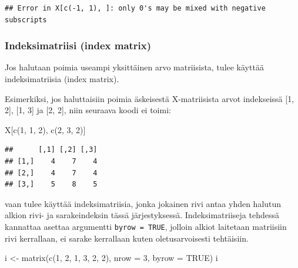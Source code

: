 \documentclass[
]{book}
\newenvironment{Shaded}{\begin{snugshade}}{\end{snugshade}}
\newcommand{\AttributeTok}[1]{\textcolor[rgb]{0.77,0.63,0.00}{#1}}
\newcommand{\ConstantTok}[1]{\textcolor[rgb]{0.00,0.00,0.00}{#1}}
\newcommand{\DecValTok}[1]{\textcolor[rgb]{0.00,0.00,0.81}{#1}}
\newcommand{\FunctionTok}[1]{\textcolor[rgb]{0.00,0.00,0.00}{#1}}
\newcommand{\NormalTok}[1]{#1}
\newcommand{\OtherTok}[1]{\textcolor[rgb]{0.56,0.35,0.01}{#1}}
\begin{document}
\begin{verbatim}
## Error in X[c(-1, 1), ]: only 0's may be mixed with negative subscripts
\end{verbatim}

\hypertarget{indeksimatriisi-index-matrix}{%
\subsubsection{Indeksimatriisi (index matrix)}\label{indeksimatriisi-index-matrix}}

Jos halutaan poimia useampi yksittäinen arvo matriisista, tulee käyttää indeksimatriisia (index matrix).

Esimerkiksi, jos haluttaisiin poimia äskeisestä X-matriisista arvot indekseissä {[}1, 2{]}, {[}1, 3{]} ja {[}2, 2{]}, niin seuraava koodi ei toimi:

\begin{Shaded}
\begin{Highlighting}[]
\NormalTok{X[}\FunctionTok{c}\NormalTok{(}\DecValTok{1}\NormalTok{, }\DecValTok{1}\NormalTok{, }\DecValTok{2}\NormalTok{), }\FunctionTok{c}\NormalTok{(}\DecValTok{2}\NormalTok{, }\DecValTok{3}\NormalTok{, }\DecValTok{2}\NormalTok{)]}
\end{Highlighting}
\end{Shaded}

\begin{verbatim}
##      [,1] [,2] [,3]
## [1,]    4    7    4
## [2,]    4    7    4
## [3,]    5    8    5
\end{verbatim}

vaan tulee käyttää indeksimatriisia, jonka jokainen rivi antaa yhden halutun alkion rivi- ja sarakeindeksin tässä järjestyksessä. Indeksimatriiseja tehdessä kannattaa asettaa argumentti \texttt{byrow\ =\ TRUE}, jolloin alkiot laitetaan matriisiin rivi kerrallaan, ei sarake kerrallaan kuten oletusarvoisesti tehtäisiin.

\begin{Shaded}
\begin{Highlighting}[]
\NormalTok{i }\OtherTok{\textless{}{-}} \FunctionTok{matrix}\NormalTok{(}\FunctionTok{c}\NormalTok{(}\DecValTok{1}\NormalTok{, }\DecValTok{2}\NormalTok{, }\DecValTok{1}\NormalTok{, }\DecValTok{3}\NormalTok{, }\DecValTok{2}\NormalTok{, }\DecValTok{2}\NormalTok{), }\AttributeTok{nrow =} \DecValTok{3}\NormalTok{, }\AttributeTok{byrow =} \ConstantTok{TRUE}\NormalTok{)}
\NormalTok{i}
\end{Highlighting}
\end{Shaded}
\end{document}
